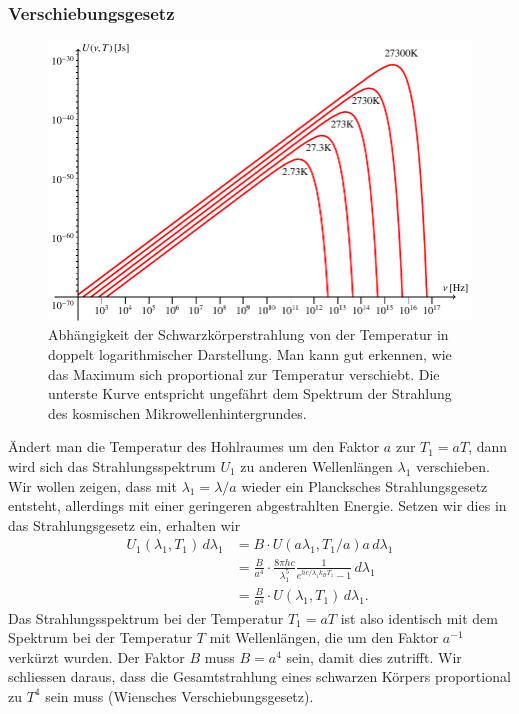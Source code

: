 \subsubsection{Verschiebungsgesetz}
\begin{figure}
\centering
\includegraphics{chapters/tikz/planck3.pdf}
\caption{Abhängigkeit der Schwarzkörperstrahlung von der Temperatur
in doppelt logarithmischer Darstellung.
Man kann gut erkennen, wie das Maximum sich proportional zur Temperatur
verschiebt.
Die unterste Kurve entspricht ungefährt dem Spektrum der Strahlung
des kosmischen Mikrowellenhintergrundes.
\label{skript:cmb:planckverschiebung}}
\end{figure}
Ändert man die Temperatur des Hohlraumes um den Faktor $a$ zur $T_1=aT$,
dann wird sich das Strahlungsspektrum $U_1$ zu anderen Wellenlängen
$\lambda_1$ verschieben.
Wir wollen zeigen, dass mit $\lambda_1=\lambda/a$ wieder ein Plancksches
Strahlungsgesetz entsteht, allerdings mit einer geringeren abgestrahlten
Energie.
Setzen wir dies in das Strahlungsgesetz ein, erhalten wir
\begin{align*}
U_1(\lambda_1,T_1)\,d\lambda_1
&=
B\cdot
U(a\lambda_1,T_1/a)a\,d\lambda_1
\\
&=
\frac{B}{a^4}
\cdot
\frac{8\pi hc}{\lambda_1^5}\frac{1}{e^{hc/\lambda_1k_BT_1}-1}\,d\lambda_1
\\
&=
\frac{B}{a^4}\cdot U(\lambda_1,T_1)\,d\lambda_1.
\end{align*}
Das Strahlungsspektrum bei der Temperatur $T_1=aT$ ist also identisch mit dem
Spektrum bei der Temperatur $T$ mit Wellenlängen, die um den Faktor $a^{-1}$
verkürzt wurden.
Der Faktor $B$ muss $B=a^4$ sein, damit dies zutrifft.
Wir schliessen daraus, dass die Gesamtstrahlung eines schwarzen Körpers
proportional zu $T^4$ sein muss (Wiensches Verschiebungsgesetz).
%
%

